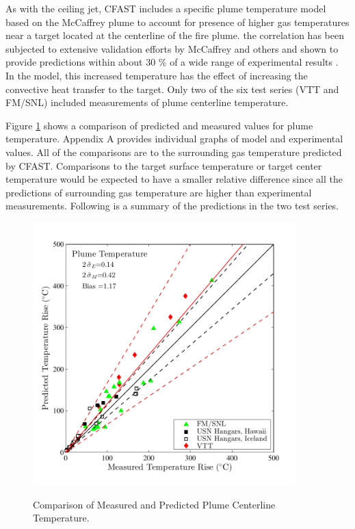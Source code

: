 As with the ceiling jet, CFAST includes a specific plume temperature model based on the McCaffrey plume \cite{Baum:1989, McCaffrey:1983} to account for presence of higher gas temperatures near a target located at the centerline of the fire plume. the correlation has been subjected to extensive validation efforts by McCaffrey \cite{Baum:1989} and others \cite{Valid:Davis_Plumes} and shown to provide predictions within about 30 \% of a wide range of experimental results \cite{Valid:Davis_Plumes}. In the model, this increased temperature has the effect of increasing the convective heat transfer to the target. Only two of the six test series (VTT and FM/SNL) included measurements of plume centerline temperature.

Figure \ref{fig:Plume_Temp_Scatter} shows a comparison of predicted and measured values for plume temperature. Appendix A provides individual graphs of model and experimental values. All of the comparisons are to the surrounding gas temperature predicted by CFAST. Comparisons to the target surface temperature or target center temperature would be expected to have a smaller relative difference since all the predictions of surrounding gas temperature are higher than experimental measurements. Following is a summary of the predictions in the two test series.

\begin{figure}
\begin{center}
\includegraphics[width=4.0in]{FIGURES/ScatterPlots/Plume_Temperature}  \\
\end{center}
\caption{Comparison of Measured and Predicted Plume Centerline Temperature.} \label{fig:Plume_Temp_Scatter}
\end{figure}

